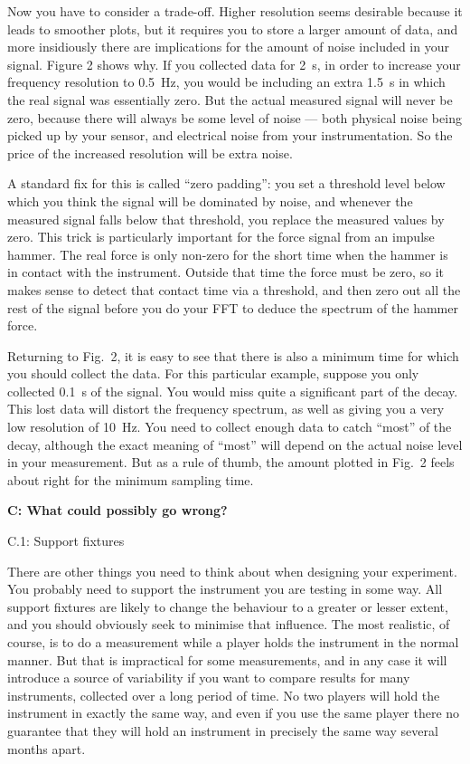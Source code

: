 
  Now you have to consider a trade-off. Higher resolution seems desirable 
  because it leads to smoother plots, but it requires you to store a larger 
  amount of data, and more insidiously there are implications for the amount of 
  noise included in your signal. Figure 2 shows why. If you collected data for 
  2~s, in order to increase your frequency resolution to 0.5~Hz, you would be 
  including an extra 1.5~s in which the real signal was essentially zero. But 
  the actual measured signal will never be zero, because there will always be 
  some level of noise — both physical noise being picked up by your sensor, and 
  electrical noise from your instrumentation. So the price of the increased 
  resolution will be extra noise. 

  A standard fix for this is called “zero padding”: you set a threshold level 
  below which you think the signal will be dominated by noise, and whenever the 
  measured signal falls below that threshold, you replace the measured values 
  by zero. This trick is particularly important for the force signal from an 
  impulse hammer. The real force is only non-zero for the short time when the 
  hammer is in contact with the instrument. Outside that time the force must be 
  zero, so it makes sense to detect that contact time via a threshold, and then 
  zero out all the rest of the signal before you do your FFT to deduce the 
  spectrum of the hammer force. 

  Returning to Fig.\ 2, it is easy to see that there is also a minimum time for 
  which you should collect the data. For this particular example, suppose you 
  only collected 0.1~s of the signal. You would miss quite a significant part 
  of the decay. This lost data will distort the frequency spectrum, as well as 
  giving you a very low resolution of 10~Hz. You need to collect enough data to 
  catch “most” of the decay, although the exact meaning of “most” will depend 
  on the actual noise level in your measurement. But as a rule of thumb, the 
  amount plotted in Fig.\ 2 feels about right for the minimum sampling time. 

  \textbf{C: What could possibly go wrong?} 

  C.1: Support fixtures 

  There are other things you need to think about when designing your 
  experiment. You probably need to support the instrument you are testing in 
  some way. All support fixtures are likely to change the behaviour to a 
  greater or lesser extent, and you should obviously seek to minimise that 
  influence. The most realistic, of course, is to do a measurement while a 
  player holds the instrument in the normal manner. But that is impractical for 
  some measurements, and in any case it will introduce a source of variability 
  if you want to compare results for many instruments, collected over a long 
  period of time. No two players will hold the instrument in exactly the same 
  way, and even if you use the same player there no guarantee that they will 
  hold an instrument in precisely the same way several months apart. 

